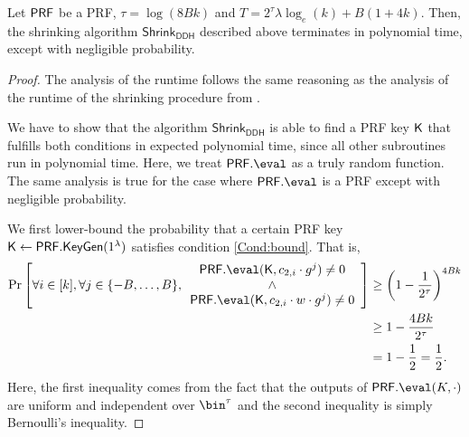 \begin{lemma}[Runtime]
\label{lemma:runtimeShrinkDDH}
Let $\mathsf{PRF}$ be a PRF, $\tau=\log(8Bk)$ and $T=2^\tau\lambda\log_e(k) + B(1+4k)$. Then, the shrinking algorithm $\mathsf{Shrink}_\mathsf{DDH}$ described above terminates in polynomial time, except with negligible probability.
\end{lemma}
\begin{proof}
The analysis of the runtime follows the same reasoning as the analysis of the runtime of the shrinking procedure from \cite{TCC:BBDGM20}.

We have to show that the algorithm $\mathsf{Shrink}_\mathsf{DDH}$ is able to find a PRF key $\mathsf{K}$ that fulfills both conditions in expected polynomial time, since all other subroutines run in polynomial time. Here, we treat $\PRF.\eval$ as a truly random function. The same analysis is true for the case where $\PRF.\eval$ is a PRF except with negligible probability.

We first lower-bound the probability that a certain PRF key $\mathsf{K}\leftarrow\mathsf{PRF}.\mathsf{KeyGen}(1^\lambda)$ satisfies condition \ref{Cond:bound}. That is,
\begin{align*}
   \Pr\left[ \forall i\in [k],\forall j\in\{-B,\dots, B\},\begin{array}{c}
        \PRF.\eval(\key,c_{2,i}\cdot g^j)\neq 0  \\
        \land \\ 
        \PRF.\eval(\key,c_{2,i}\cdot w\cdot g^j)\neq 0
   \end{array}\right]& \geq \left(1-\frac{1}{2^\tau}\right)^{4Bk} \\ 
   &\geq 1-\frac{4Bk}{2^\tau}\\
   &= 1-\frac{1}{2}=\frac{1}{2}.
\end{align*}
Here, the first inequality comes from the fact that the outputs of $\PRF.\eval(K,\cdot)$ are uniform and independent over $\bin^\tau$ and the second inequality is simply Bernoulli's inequality.


\end{proof}
